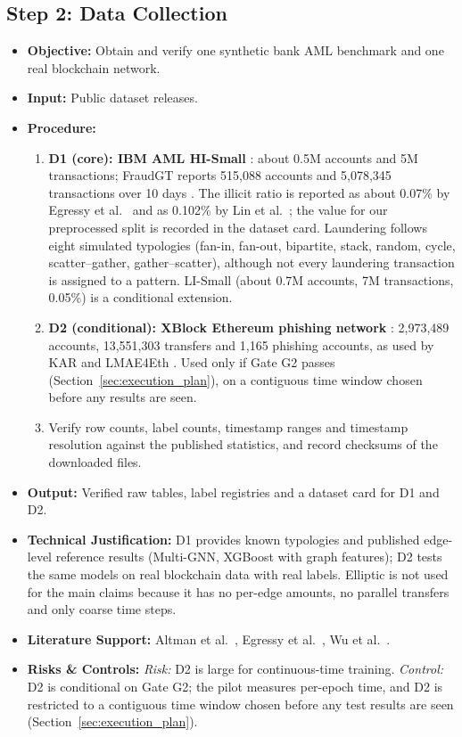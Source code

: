\documentclass[11pt,a4paper]{article}
\begin{document}
\subsection{Step 2: Data Collection}
\begin{itemize}[leftmargin=*]
    \item \textbf{Objective:} Obtain and verify one synthetic bank AML benchmark and one real blockchain network.
    \item \textbf{Input:} Public dataset releases.
    \item \textbf{Procedure:}
    \begin{enumerate}[leftmargin=*]
        \item \textbf{D1 (core): IBM AML HI-Small} \cite{altman2023ibmaml}: about 0.5M accounts and 5M transactions; FraudGT reports 515,088 accounts and 5,078,345 transactions over 10 days \cite{lin2024fraudgt}. The illicit ratio is reported as about 0.07\% by Egressy et al.\ \cite{egressy2024multigraph} and as 0.102\% by Lin et al.\ \cite{lin2024fraudgt}; the value for our preprocessed split is recorded in the dataset card. Laundering follows eight simulated typologies (fan-in, fan-out, bipartite, stack, random, cycle, scatter--gather, gather--scatter), although not every laundering transaction is assigned to a pattern. LI-Small (about 0.7M accounts, 7M transactions, 0.05\%) is a conditional extension.
        \item \textbf{D2 (conditional): XBlock Ethereum phishing network} \cite{wu2022phishers}: 2,973,489 accounts, 13,551,303 transfers and 1,165 phishing accounts, as used by KAR and LMAE4Eth \cite{tian2025kar,jia2025lmae4eth}. Used only if Gate G2 passes (Section~\ref{sec:execution_plan}), on a contiguous time window chosen before any results are seen.
        \item Verify row counts, label counts, timestamp ranges and timestamp resolution against the published statistics, and record checksums of the downloaded files.
    \end{enumerate}
    \item \textbf{Output:} Verified raw tables, label registries and a dataset card for D1 and D2.
    \item \textbf{Technical Justification:} D1 provides known typologies and published edge-level reference results (Multi-GNN, XGBoost with graph features); D2 tests the same models on real blockchain data with real labels. Elliptic is not used for the main claims because it has no per-edge amounts, no parallel transfers and only coarse time steps.
    \item \textbf{Literature Support:} Altman et al.\ \cite{altman2023ibmaml}, Egressy et al.\ \cite{egressy2024multigraph}, Wu et al.\ \cite{wu2022phishers}.
    \item \textbf{Risks \& Controls:} \textit{Risk:} D2 is large for continuous-time training. \textit{Control:} D2 is conditional on Gate G2; the pilot measures per-epoch time, and D2 is restricted to a contiguous time window chosen before any test results are seen (Section~\ref{sec:execution_plan}).
\end{itemize}
\end{document}
